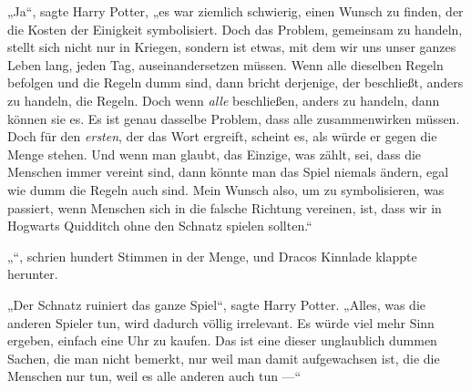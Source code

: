 „Ja“, sagte Harry Potter, „es war ziemlich schwierig, einen Wunsch zu finden, der die Kosten der Einigkeit symbolisiert. Doch das Problem, gemeinsam zu handeln, stellt sich nicht nur in Kriegen, sondern ist etwas, mit dem wir uns unser ganzes Leben lang, jeden Tag, auseinandersetzen müssen. Wenn alle dieselben Regeln befolgen und die Regeln dumm sind, dann bricht derjenige, der beschließt, anders zu handeln, die Regeln. Doch wenn \emph{alle} beschließen, anders zu handeln, dann können sie es. Es ist genau dasselbe Problem, dass alle zusammenwirken müssen. Doch für den \emph{ersten}, der das Wort ergreift, scheint es, als würde er gegen die Menge stehen. Und wenn man glaubt, das Einzige, was zählt, sei, dass die Menschen immer vereint sind, dann könnte man das Spiel niemals ändern, egal wie dumm die Regeln auch sind. Mein Wunsch also, um zu symbolisieren, was passiert, wenn Menschen sich in die falsche Richtung vereinen, ist, dass wir in Hogwarts Quidditch ohne den Schnatz spielen sollten.“

„“, schrien hundert Stimmen in der Menge, und Dracos Kinnlade klappte herunter.

„Der Schnatz ruiniert das ganze Spiel“, sagte Harry Potter.
„Alles, was die anderen Spieler tun, wird dadurch völlig irrelevant. Es würde viel mehr Sinn ergeben, einfach eine Uhr zu kaufen. Das ist eine dieser unglaublich dummen Sachen, die man nicht bemerkt, nur weil man damit aufgewachsen ist, die die Menschen nur tun, weil es alle anderen auch tun —“

